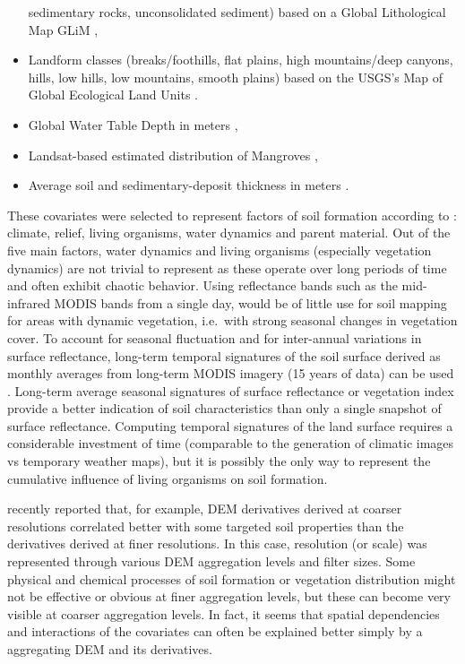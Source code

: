 \documentclass[graybox,natbib,nospthms,UStrade]{svmono}
\begin{document}
\begin{itemize}
  sedimentary rocks, unconsolidated sediment) based on a Global
  Lithological Map GLiM \citep{GGGE:GGGE2352},
\item
  Landform classes (breaks/foothills, flat plains, high mountains/deep
  canyons, hills, low hills, low mountains, smooth plains) based on
  the USGS's Map of Global Ecological Land Units \citep{sayre2014new}.
\item
  Global Water Table Depth in meters \citep{fan2013global},
\item
  Landsat-based estimated distribution of Mangroves \citep{giri2011status},
\item
  Average soil and sedimentary-deposit thickness in meters \citep{Pelletier2016}.
\end{itemize}

These covariates were selected to represent factors of soil formation
according to \citet{jenny1994factors}: climate, relief, living organisms,
water dynamics and parent material. Out of the five main factors, water
dynamics and living organisms (especially vegetation dynamics) are not
trivial to represent as these operate over long periods of time and
often exhibit chaotic behavior. Using reflectance bands such as the
mid-infrared MODIS bands from a single day, would be of little use for
soil mapping for areas with dynamic vegetation, i.e.~with strong
seasonal changes in vegetation cover. To account for seasonal
fluctuation and for inter-annual variations in surface reflectance,
long-term temporal signatures of the soil surface derived
as monthly averages from long-term MODIS imagery (15 years of data)
can be used \citep{Hengl2017SoilGrids250m}.
Long-term average seasonal signatures of surface reflectance or vegetation
index provide a better indication of soil characteristics than only a single snapshot of
surface reflectance. Computing temporal signatures of the land surface
requires a considerable investment of time (comparable to the generation
of climatic images vs temporary weather maps), but it is possibly the
only way to represent the cumulative influence of living organisms on
soil formation.

\citet{Behrens2018128} recently reported that, for example, DEM
derivatives derived at coarser resolutions correlated better with some
targeted soil properties than the derivatives derived at finer resolutions. In
this case, resolution (or scale) was represented through various DEM aggregation levels
and filter sizes. Some physical and chemical processes of soil formation
or vegetation distribution might not be effective or obvious at finer aggregation
levels, but these can become very visible at coarser aggregation levels. In
fact, it seems that spatial dependencies and interactions of the
covariates can often be explained better simply by a aggregating DEM and its
derivatives.
\end{document}
